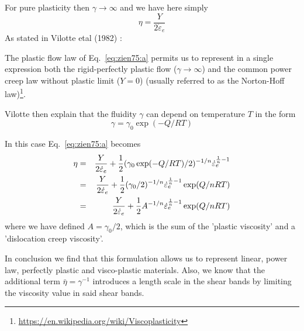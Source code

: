 For pure plasticity then $\gamma \rightarrow \infty$ and we have here simply
\[
\eta = \frac{Y}{2  \dot\varepsilon_e}
\]
As stated in Vilotte etal (1982) \cite{vidm82}: 
\begin{displayquote}
{\color{darkgray}
The plastic flow law of Eq.~\eqref{eq:zien75:a} permits us to
represent in a single expression both the rigid-perfectly plastic flow
($\gamma\rightarrow \infty$)
and the common power creep law without plastic limit ($Y=0$)
(usually referred to as the Norton-Hoff law)\footnote{\url{https://en.wikipedia.org/wiki/Viscoplasticity}}.}
\end{displayquote}
Vilotte \cite{vidm82} then explain that the fluidity $\gamma$ can depend on temperature $T$ in the form 
\[
\gamma = \gamma_0 \exp(-Q/RT)
\]

In this case Eq.~\eqref{eq:zien75:a} becomes
\begin{eqnarray}
\eta 
&=& \frac{ Y }{2  \dot\varepsilon_e} + \frac{1 }{2 } ( \gamma_0 \exp(-Q/RT) /2)^{-1/n}  \dot\varepsilon_e^{\frac1n-1}  \nonumber\\
&=& \frac{ Y }{2  \dot\varepsilon_e} + \frac{1 }{2 } ( \gamma_0 /2)^{-1/n}  \dot\varepsilon_e^{\frac1n-1}  \exp(Q/nRT) \nonumber\\
&=& \frac{ Y }{2  \dot\varepsilon_e} + \frac{1 }{2 } A^{-1/n}  \dot\varepsilon_e^{\frac1n-1}  \exp(Q/nRT) 
\end{eqnarray}
where we have defined $A=\gamma_0/2$,
which is the sum of the 'plastic viscosity' and a 'dislocation creep viscosity'.

In conclusion we find that this formulation allows us to represent linear, power law,
perfectly plastic and visco-plastic materials.
Also, we know that the additional term $\bar\eta=\gamma^{-1}$ introduces a length scale
in the shear bands by limiting the viscosity value in said shear bands.



